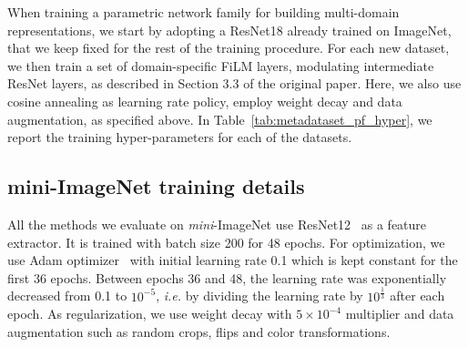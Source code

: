 \documentclass[runningheads]{llncs}
\begin{document}
When training a parametric network family for building multi-domain
representations, we start by adopting a ResNet18 already trained on ImageNet,
that we keep fixed for the rest of the training procedure. For each new dataset,
we then train a set of domain-specific FiLM layers, modulating intermediate
ResNet layers, as described in Section 3.3
of the original paper. Here, we also use cosine annealing as learning rate
policy, employ weight decay and data augmentation, as specified above. In
Table~\ref{tab:metadataset_pf_hyper}, we report the training hyper-parameters
for each of the datasets.

\subsection{mini-ImageNet training details}
All the methods we evaluate on \textit{mini}-ImageNet use
ResNet12~\cite{oreshkin2018tadam} as a feature extractor. It is trained with
batch size 200 for 48 epochs. For optimization, we use Adam
optimizer~\cite{adam} with initial learning rate 0.1 which is kept constant for
the first 36 epochs. Between epochs 36 and 48, the learning rate was
exponentially decreased from 0.1 to $10^{-5}$, \textit{i.e.} by dividing the learning rate by
$10^{\frac{1}{3}}$ after each epoch. As regularization, we use weight decay with
$5\times 10^{-4}$ multiplier and data augmentation such as random crops, flips
and color transformations.
\end{document}
